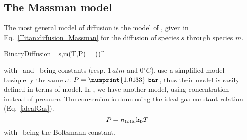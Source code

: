 \subsection{The Massman model}

The most general model of diffusion is the model of \citet{Massman1998}, given
in Eq.~\ref{Titan:diffusion_Massman} for the diffusion of species $s$ through
species $m$.
\begin{equationCode}{BinaryDiffusion}
\diff_{s,m}(T,P) =  \left(\right)^{}
\label{Titan:diffusion_Massman}
\end{equationCode}
with \Pz\ and \Tz\ being constants (resp. $1~\unit{atm}$ and $0\unit{^\circ C}$).
\citet{Wakeham1973} use a simplified model, basiquelly the same at $P=\numprint{1.0133}~\unit{bar}$, thus
their model is easily defined in terms of \citet{Massman1998} model. In \citet{WilsonPhD,Haye2005},
we have another model, using concentration instead of pressure. The conversion is done
using the ideal gas constant relation (Eq.~\ref{idealGas}).
\begin{equation}
P = n_\text{total}\text{k}_\text{b} T
\label{idealGas}
\end{equation}
with \kb\ being the Boltzmann constant.

